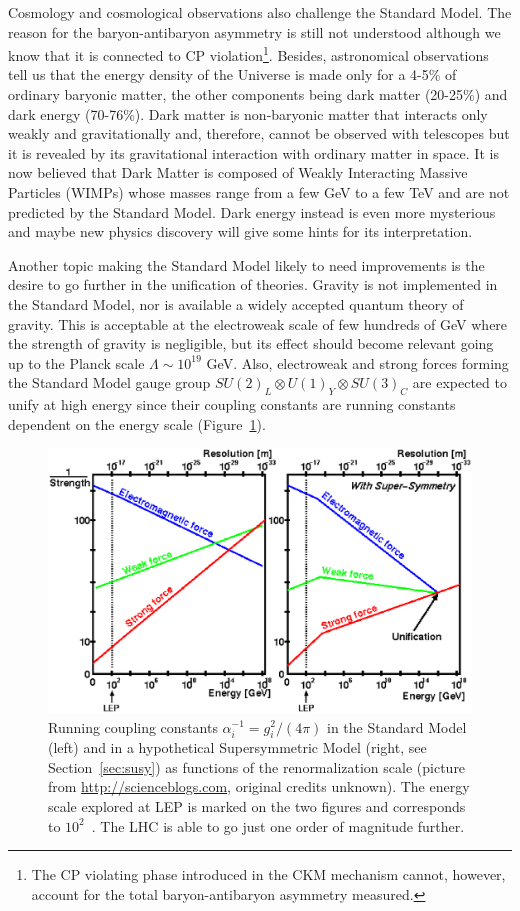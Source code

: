 Cosmology and cosmological observations also challenge 
the Standard Model. The reason for the baryon-antibaryon 
asymmetry is still not understood although we know 
that it is connected to  CP violation\footnote{The CP violating 
phase introduced in the CKM mechanism cannot, however, 
account for the total baryon-antibaryon asymmetry measured.}. 
Besides, astronomical observations~\cite{Ade:2013zuv} 
tell us that the energy density of the 
Universe is made only for a 4-5\% of ordinary baryonic 
matter, the other components being dark matter (20-25\%) 
and dark energy (70-76\%). Dark matter is non-baryonic 
matter that interacts only weakly and gravitationally and,
therefore, cannot be observed with telescopes but it
is revealed by its gravitational interaction with ordinary 
matter in space. 
It is now believed that Dark Matter is composed  of 
Weakly Interacting Massive Particles (WIMPs) whose 
masses range from a few GeV to a few TeV and  are 
not predicted by the Standard Model. Dark energy instead is 
even more mysterious and maybe new physics discovery will 
give some hints for its interpretation.

Another topic making the Standard Model likely to 
need improvements is the desire to go further in 
the unification of theories. Gravity is not 
implemented in the Standard Model, nor is available
a widely accepted quantum theory of gravity.
This is acceptable at the electroweak scale of 
few hundreds of GeV where the strength of gravity
is negligible, but its effect should become relevant 
going up to the Planck scale $\Lambda \sim 10^{19}$ GeV. 
Also, electroweak and strong forces forming the Standard 
Model gauge group $SU(2)_{L}\otimes U(1)_{Y}\otimes SU(3)_{C}$ 
are expected to unify at high energy since their coupling 
constants are running constants dependent on the energy 
scale (Figure~\ref{running}).
\begin{figure}[htb]\begin{center}
\includegraphics[width=.8\textwidth]{theory/figures/running_coupling}
\caption{Running coupling constants $\alpha^{-1}_{i} = g^{2}_{i}/(4\pi)$ in the Standard Model (left) and 
in a hypothetical Supersymmetric Model (right, see Section~\ref{sec:susy}) 
as functions of the renormalization scale (picture from \url{http://scienceblogs.com},
original credits unknown). The energy scale explored at LEP is marked
on the two figures and corresponds to $10^2$~\gev. The LHC is able to
go just one order of magnitude further.}
\label{running}\end{center}\end{figure}

